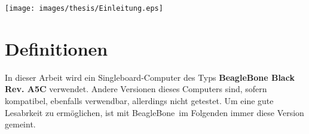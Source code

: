 \vfill

\texttt{[image: images/thesis/Einleitung.eps]}

\vfill

\section{Definitionen}
In dieser Arbeit wird ein Singleboard-Computer des Typs \textbf{BeagleBone Black Rev. A5C} verwendet. Andere Versionen dieses Computers sind, sofern kompatibel, ebenfalls verwendbar, allerdings nicht getestet. Um eine gute Lesabrkeit zu ermöglichen, ist mit \glqq BeagleBone\grqq ~im Folgenden immer diese Version gemeint.
